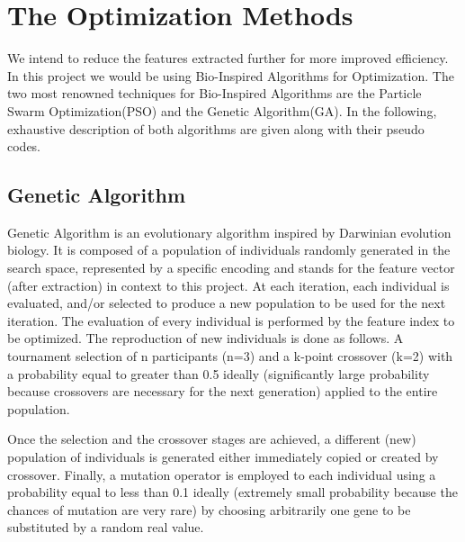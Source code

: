 \documentclass[a4paper,12pt]{report}
\begin{document}
\chapter{The Optimization Methods}
We intend to reduce the features extracted further for more improved efficiency. In this project we would be using Bio-Inspired Algorithms for Optimization. The two most renowned techniques for Bio-Inspired Algorithms are the Particle Swarm Optimization(PSO) and the Genetic Algorithm(GA). In the following, exhaustive description of both algorithms are given along with their pseudo codes.

\section{Genetic Algorithm}
Genetic Algorithm is an evolutionary algorithm inspired by Darwinian evolution biology. It is composed of a population of individuals randomly generated in the search space, represented by a specific encoding and stands for the feature vector (after extraction) in context to this project. At each iteration, each individual is evaluated, and/or selected to produce a new population to be used for the next iteration. The evaluation of every individual is performed by the feature index to be optimized. The reproduction of new individuals is done as follows. A tournament selection of n participants (n=3) and a k-point crossover (k=2) with a probability equal to greater than 0.5 ideally (significantly large probability because crossovers are necessary for the next generation) applied to the entire population.\par
\noindent Once the selection and the crossover stages are achieved, a different (new) population of individuals is generated either immediately copied or created by crossover. Finally, a mutation operator is employed to each individual using a probability equal to less than 0.1 ideally (extremely small probability because the chances of mutation are very rare) by choosing arbitrarily one gene to be substituted by a random real value.\par
\end{document}
